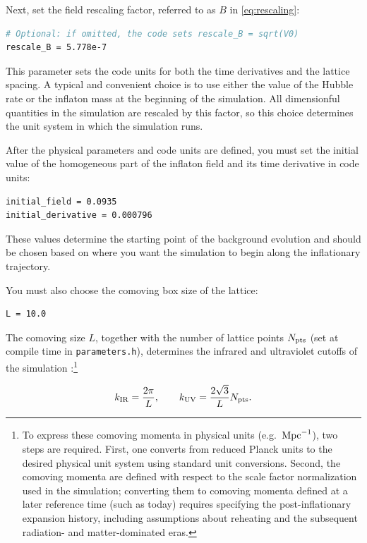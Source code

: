 \documentclass[aps, nofootinbib,superscriptaddress, preprintnumbers, longbibliography]{article}
\begin{document}
Next, set the field rescaling factor, referred to as $B$ in \cref{eq:rescaling}:
\begin{lstlisting}[language=bash,numbers=none]
# Optional: if omitted, the code sets rescale_B = sqrt(V0)
rescale_B = 5.778e-7
\end{lstlisting}
This parameter sets the code units for both the time derivatives and the lattice spacing. A typical and convenient choice is to use either the value of the Hubble rate or the inflaton mass at the beginning of the simulation. All dimensionful quantities in the simulation are rescaled by this factor, so this choice determines the unit system in which the simulation runs.

After the physical parameters and code units are defined, you must set the initial value of the homogeneous part of the inflaton field and its time derivative in code units:
\begin{lstlisting}[language=bash,numbers=none]
initial_field = 0.0935
initial_derivative = 0.000796
\end{lstlisting}
These values determine the starting point of the background evolution and should be chosen based on where you want the simulation to begin along the inflationary trajectory. 

You must also choose the comoving box size of the lattice:
\begin{lstlisting}[language=bash,numbers=none]
L = 10.0
\end{lstlisting}
The comoving size $L$, together with the number of lattice points $N_{\rm pts}$ (set at compile time in \texttt{parameters.h}), determines the infrared and ultraviolet cutoffs of the simulation \cite{Caravano:2021pgc}:\footnote{
To express these comoving momenta in physical units (e.g.\ ${\rm Mpc}^{-1}$), two steps are required. First, one converts from reduced Planck units to the desired physical unit system using standard unit conversions. Second, the comoving momenta are defined with respect to the scale factor normalization used in the simulation; converting them to comoving momenta defined at a later reference time (such as today) requires specifying the post-inflationary expansion history, including assumptions about reheating and the subsequent radiation- and matter-dominated eras.
}

\begin{equation}
\label{eq:modes}
k_{\rm IR} = \frac{2\pi}{L},\quad\quad k_{\rm UV} = \frac{2\sqrt{3}}{L}N_{\rm pts}.
\end{equation}
\end{document}
